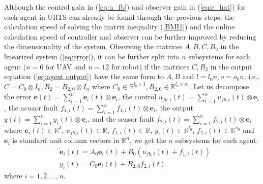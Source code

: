 \documentclass[journal,12pt,onecolumn,draftclsnofoot,]{IEEEtran}
\begin{document}

Although the control gain in (\ref{eq:u_fb}) and observer gain in (\ref{eq:e_hat}) for each agent in URTS can already be found through the previous steps, the calculation speed of solving the matrix inequality (\ref{BMI1}) and the online calculation speed of controller and observer can be further improved by reducing the dimensionality of the system. Observing the matrices $A,B,C,B_2$ in the linearized system (\ref{eq:error}), it can be further split into $n$ subsystems for each agent ($n=6$ for UAV and $n=12$ for robot) if the matrices $C,B_2$ in the output equation (\ref{eq:agent output}) have the same form to $A,B$ and $l=l_0n, o=o_0n$, i.e., $C = C_0\otimes I_n,B_2 = B_{2,0}\otimes I_n$ where $C_0\in\mathbb{R}^{l_0\times 3},B_{2,0}\in\mathbb{R}^{l_0\times o_0}$. Let us decompose 
the error $\pmb{e}(t)=\sum_{i=1}^{n} \pmb{e}_i(t)\otimes\mathbf{e}_i$, 
the control $u_{fb,i}(t)=\sum_{i=1}^{n} {u}_{fb,i}(t)\otimes\mathbf{e}_i$, 
the acuaor fault $f_{1,i}(t)=\sum_{i=1}^{n} {f}_{1,i}(t)\otimes\mathbf{e}_i$, 
the output $y(t)=\sum_{i=1}^{n} {y}_i(t)\otimes\mathbf{e}_i$, 
and the sensor fault $f_{2,i}(t)=\sum_{i=1}^{n} {f}_{2,i}(t)\otimes\mathbf{e}_i$ 
where $\pmb{e}_i(t)\in\mathbb{R}^3$, $u_{fb,i}(t)\in\mathbb{R}$, $f_{1,i}(t)\in\mathbb{R}$, $y_i(t)\in\mathbb{R}^{l_0}$, $f_{2,i}(t)\in\mathbb{R}^{o_0}$ and $\mathbf{e}_i$ is standard unit column vectors in $\mathbb{R}^n$, we get the $n$ subsystems for each agent:
\begin{equation} \label{eq:linear subsys}
    \begin{split}
        & \dot{\pmb{e}}_i(t)=A_0\pmb{e}_i(t)+B_0(u_{fb,i}(t)+f_{1,i}(t)) \\
        & {y}_i(t)=C_0\pmb{e}_i(t)+B_{2,0}f_{2,i}(t)   
    \end{split}
\end{equation} where $i=1,2,...,n$.
\end{document}
